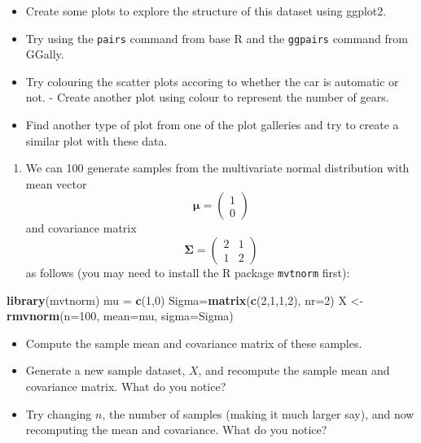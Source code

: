 \documentclass[]{book}
\newenvironment{Shaded}{\begin{snugshade}}{\end{snugshade}}
\newcommand{\DataTypeTok}[1]{\textcolor[rgb]{0.13,0.29,0.53}{#1}}
\newcommand{\DecValTok}[1]{\textcolor[rgb]{0.00,0.00,0.81}{#1}}
\newcommand{\KeywordTok}[1]{\textcolor[rgb]{0.13,0.29,0.53}{\textbf{#1}}}
\newcommand{\NormalTok}[1]{#1}
\newcommand{\StringTok}[1]{\textcolor[rgb]{0.31,0.60,0.02}{#1}}
\providecommand{\tightlist}{%
  \setlength{\itemsep}{0pt}\setlength{\parskip}{0pt}}
\theoremstyle{definition}
\theoremstyle{definition}
\theoremstyle{definition}
\theoremstyle{remark}
\begin{document}
\begin{itemize}
\tightlist
\item
  Create some plots to explore the structure of this dataset using ggplot2.
\item
  Try using the \texttt{pairs} command from base R and the \texttt{ggpairs} command from GGally.
\item
  Try colouring the scatter plots accoring to whether the car is automatic or not. - Create another plot using colour to represent the number of gears.
\item
  Find another type of plot from one of the plot galleries and try to create a similar plot with these data.
\end{itemize}

\begin{enumerate}
\def\labelenumi{\arabic{enumi}.}
\setcounter{enumi}{3}
\tightlist
\item
  We can 100 generate samples from the multivariate normal distribution with mean vector
  \[{\boldsymbol{\mu}}= \left(\begin{array}{c}1\\0\end{array}\right)\]
  and covariance matrix
  \[\boldsymbol{\Sigma}= \left(\begin{array}{cc}2&1\\1&2\end{array}\right)\]
  as follows (you may need to install the R package \texttt{mvtnorm} first):
\end{enumerate}

\begin{Shaded}
\begin{Highlighting}[]
\KeywordTok{library}\NormalTok{(mvtnorm)}
\NormalTok{mu =}\StringTok{ }\KeywordTok{c}\NormalTok{(}\DecValTok{1}\NormalTok{,}\DecValTok{0}\NormalTok{)}
\NormalTok{Sigma=}\KeywordTok{matrix}\NormalTok{(}\KeywordTok{c}\NormalTok{(}\DecValTok{2}\NormalTok{,}\DecValTok{1}\NormalTok{,}\DecValTok{1}\NormalTok{,}\DecValTok{2}\NormalTok{), }\DataTypeTok{nr=}\DecValTok{2}\NormalTok{)}
\NormalTok{X <-}\StringTok{ }\KeywordTok{rmvnorm}\NormalTok{(}\DataTypeTok{n=}\DecValTok{100}\NormalTok{, }\DataTypeTok{mean=}\NormalTok{mu, }\DataTypeTok{sigma=}\NormalTok{Sigma)}
\end{Highlighting}
\end{Shaded}

\begin{itemize}
\tightlist
\item
  Compute the sample mean and covariance matrix of these samples.
\item
  Generate a new sample dataset, \(X\), and recompute the sample mean and covariance matrix. What do you notice?
\item
  Try changing \(n\), the number of samples (making it much larger say), and now recomputing the mean and covariance. What do you notice?
\end{itemize}
\end{document}

